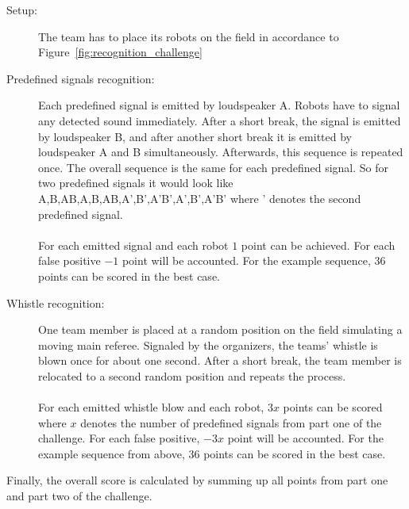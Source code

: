 \documentclass[12pt]{article}
\begin{document}
\begin{description}
	\item[Setup:] The team has to place its robots on the field in accordance to Figure~\ref{fig:recognition_challenge}
	\item[Predefined signals recognition:] Each predefined signal is emitted by loudspeaker A. Robots have to signal any detected sound immediately. After a short break, the signal is emitted by loudspeaker B, and after another short break it is emitted by loudspeaker A and B simultaneously. Afterwards, this sequence is repeated once. The overall sequence is the same for each predefined signal. So for two predefined signals it would look like A,B,AB,A,B,AB,A',B',A'B',A',B',A'B' where ' denotes the second predefined signal.\\
	\\For each emitted signal and each robot $1$ point can be achieved. For each false positive $-1$ point will be accounted. For the example sequence, $36$ points can be scored in the best case.
	\item[Whistle recognition:] One team member is placed at a random position on the field simulating a moving main referee. Signaled by the organizers, the teams' whistle is blown once for about one second. After a short break, the team member is relocated to a second random position and repeats the process.\\
	\\ For each emitted whistle blow and each robot, $3x$ points can be scored where $x$ denotes the number of predefined signals from part one of the challenge. For each false positive, $-3x$ point will be accounted. For the example sequence from above, $36$ points can be scored in the best case.
\end{description}

Finally, the overall score is calculated by summing up all points from part one and part two of the challenge.
\end{document}
